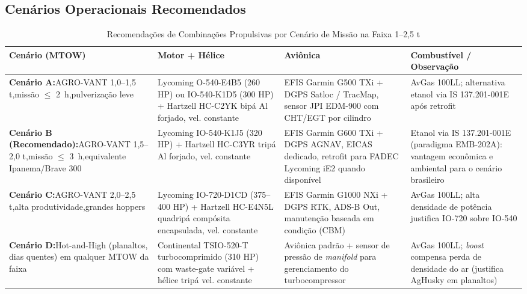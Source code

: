 \documentclass[a4paper,12pt]{article}
\begin{document}
\subsection{Cenários Operacionais Recomendados}

\begin{table}[H]
\centering
\caption{Recomendações de Combinações Propulsivas por Cenário de Missão na Faixa 1--2{,}5 t}
\label{tab:recomendacoes}
\footnotesize
\renewcommand{\arraystretch}{1.3}
\begin{tabularx}{\textwidth}{@{} 
    >{\hsize=0.9\hsize\raggedright\arraybackslash}X 
    >{\hsize=1.0\hsize\raggedright\arraybackslash}X 
    >{\hsize=0.9\hsize\raggedright\arraybackslash}X 
    >{\hsize=1.2\hsize\raggedright\arraybackslash}X 
    @{}}
\toprule
\textbf{Cenário (MTOW)} & \textbf{Motor + Hélice} & \textbf{Aviônica} & \textbf{Combustível / Observação} \\ \midrule
\textbf{Cenário A:}\newline AGRO-VANT 1{,}0--1{,}5 t,\newline missão $\leq$ \SI{2}{h},\newline pulverização leve & Lycoming O-540-E4B5 (260 HP) ou IO-540-K1D5 (300 HP) + Hartzell HC-C2YK bipá Al forjado, vel. constante & EFIS Garmin G500 TXi + DGPS Satloc / TracMap, sensor JPI EDM-900 com CHT/EGT por cilindro & AvGas 100LL; alternativa etanol via IS 137.201-001E após retrofit \\
\addlinespace
\textbf{Cenário B (Recomendado):}\newline AGRO-VANT 1{,}5--2{,}0 t,\newline missão $\leq$ \SI{3}{h},\newline equivalente Ipanema/Brave 300 & Lycoming IO-540-K1J5 (320 HP) + Hartzell HC-C3YR tripá Al forjado, vel. constante & EFIS Garmin G600 TXi + DGPS AGNAV, EICAS dedicado, retrofit para FADEC Lycoming iE2 quando disponível & Etanol via IS 137.201-001E (paradigma EMB-202A): vantagem econômica e ambiental para o cenário brasileiro \\
\addlinespace
\textbf{Cenário C:}\newline AGRO-VANT 2{,}0--2{,}5 t,\newline alta produtividade,\newline grandes hoppers & Lycoming IO-720-D1CD (375--400 HP) + Hartzell HC-E4N5L quadripá compósita encapsulada, vel. constante & EFIS Garmin G1000 NXi + DGPS RTK, ADS-B Out, manutenção baseada em condição (CBM) & AvGas 100LL; alta densidade de potência justifica IO-720 sobre IO-540 \\
\addlinespace
\textbf{Cenário D:}\newline Hot-and-High (planaltos, dias quentes) em qualquer MTOW da faixa & Continental TSIO-520-T turbocomprimido (310 HP) com waste-gate variável + hélice tripá vel. constante & Aviônica padrão + sensor de pressão de \textit{manifold} para gerenciamento do turbocompressor & AvGas 100LL; \textit{boost} compensa perda de densidade do ar (justifica AgHusky em planaltos) \\ \bottomrule
\end{tabularx}
\end{table}
\end{document}
